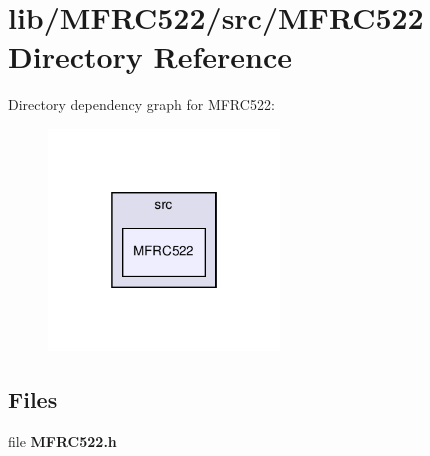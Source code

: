 \section{lib/\+M\+F\+R\+C522/src/\+M\+F\+R\+C522 Directory Reference}
\label{dir_8917d18e3e07827f87442dfed2a391c1}
Directory dependency graph for M\+F\+R\+C522\+:\nopagebreak
\begin{figure}[H]
\begin{center}
\leavevmode
\includegraphics[width=174pt]{dir_8917d18e3e07827f87442dfed2a391c1_dep}
\end{center}
\end{figure}
\subsection*{Files}
\begin{DoxyCompactItemize}
\item 
file \textbf{ M\+F\+R\+C522.\+h}
\end{DoxyCompactItemize}
